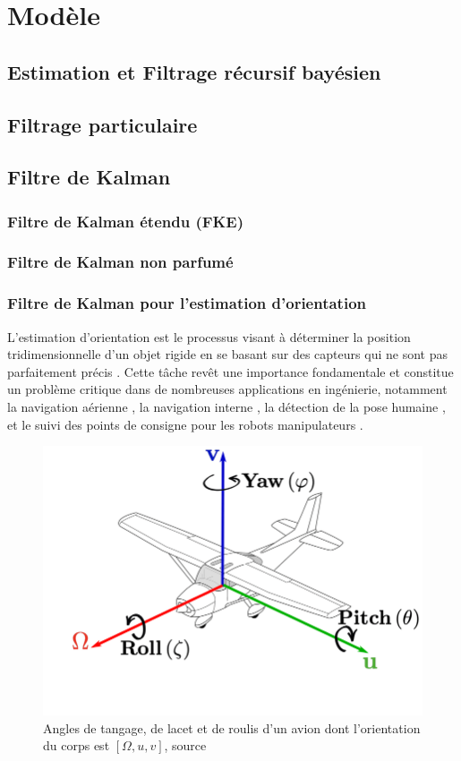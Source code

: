 \documentclass[8pt]{article}
\begin{document}
 \newpage
\section{Modèle}
\label{modèle}
\subsection{Estimation et Filtrage récursif bayésien}
\subsection{Filtrage particulaire}
\subsection{Filtre de Kalman}
\subsubsection{Filtre de Kalman étendu (FKE)}
\subsubsection{Filtre de Kalman non parfumé }
\subsubsection{Filtre de Kalman pour l'estimation d'orientation}
\label{subsubsec:yrp}

L'estimation d'orientation est le processus visant à déterminer la position tridimensionnelle d'un objet rigide en se basant sur des capteurs qui ne sont pas parfaitement précis . Cette tâche revêt une importance fondamentale et constitue un problème critique dans de nombreuses applications en ingénierie, notamment la navigation aérienne \cite{dai_navigation_2019}, la navigation interne \cite{santos_indoor_2015}, la détection de la pose humaine \cite{severin_head_2020}, et le suivi des points de consigne pour les robots manipulateurs \cite{ogata_robust_2019}.
\begin{figure}[H]
    \centering
    \includegraphics[width=0.5\linewidth]{../ypr.png}
    \caption{ Angles de tangage, de lacet et de roulis d'un avion dont l'orientation du corps est $[\Omega, u, v]$, source \cite{noauthor_figure_nodate}} 
    \label{fig:attitude}

\end{figure}
\end{document}

